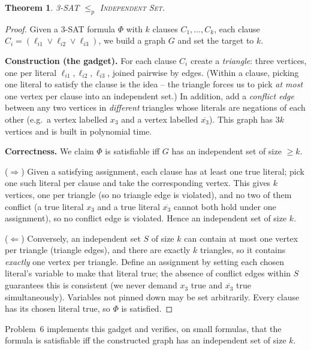 \documentclass[11pt]{article}
\newtheorem{theorem}{Theorem}[section]
\begin{document}
\begin{theorem}
\label{thm:3sat-is}
\textsc{3-SAT} $\le_p$ \textsc{Independent Set}.
\end{theorem}

\begin{proof}
Given a 3-SAT formula $\Phi$ with $k$ clauses $C_1, \ldots, C_k$, each clause $C_i =
(\ell_{i1} \vee \ell_{i2} \vee \ell_{i3})$, we build a graph $G$ and set the target to $k$.

\textbf{Construction (the gadget).} For each clause $C_i$ create a \emph{triangle}: three
vertices, one per literal $\ell_{i1}, \ell_{i2}, \ell_{i3}$, joined pairwise by edges.
(Within a clause, picking one literal to satisfy the clause is the idea -- the triangle
forces us to pick \emph{at most} one vertex per clause into an independent set.) In
addition, add a \emph{conflict edge} between any two vertices in \emph{different} triangles
whose literals are negations of each other (e.g.\ a vertex labelled $x_3$ and a vertex
labelled $\overline{x_3}$). This graph has $3k$ vertices and is built in polynomial time.

\textbf{Correctness.} We claim $\Phi$ is satisfiable iff $G$ has an independent set of size
$\ge k$.

($\Rightarrow$) Given a satisfying assignment, each clause has at least one true literal;
pick one such literal per clause and take the corresponding vertex. This gives $k$
vertices, one per triangle (so no triangle edge is violated), and no two of them conflict
(a true literal $x_3$ and a true literal $\overline{x_3}$ cannot both hold under one
assignment), so no conflict edge is violated. Hence an independent set of size $k$.

($\Leftarrow$) Conversely, an independent set $S$ of size $k$ can contain at most one vertex
per triangle (triangle edges), and there are exactly $k$ triangles, so it contains
\emph{exactly} one vertex per triangle. Define an assignment by setting each chosen
literal's variable to make that literal true; the absence of conflict edges within $S$
guarantees this is consistent (we never demand $x_3$ true and $\overline{x_3}$ true
simultaneously). Variables not pinned down may be set arbitrarily. Every clause has its
chosen literal true, so $\Phi$ is satisfied.
\end{proof}

Problem~6 implements this gadget and verifies, on small formulas, that the formula is
satisfiable iff the constructed graph has an independent set of size $k$.
\end{document}
